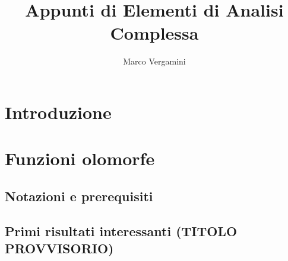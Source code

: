 \documentclass{article}
\title{Appunti di Elementi di Analisi Complessa}
\date{}
\author{Marco Vergamini}
\begin{document}
\maketitle
\newpage
\tableofcontents
\newpage


\section{Introduzione}


\newpage

\section{Funzioni olomorfe}

\subsection{Notazioni e prerequisiti}


\subsection{Primi risultati interessanti (TITOLO PROVVISORIO)}

\end{document}
